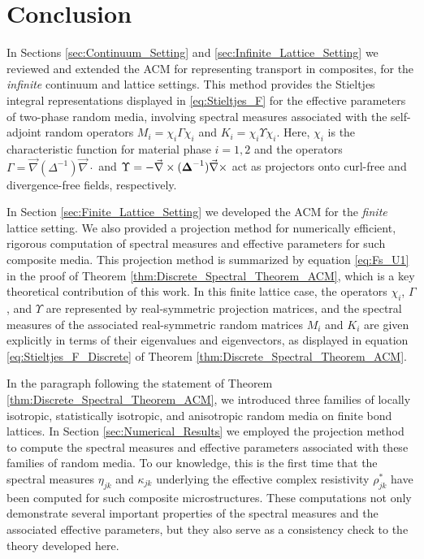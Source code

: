 \documentclass{cmslatex}
\newcommand\bDelta{\mbox{\boldmath${\Delta}$}}
\begin{document}
\section{Conclusion}
%
In Sections \ref{sec:Continuum_Setting} and
\ref{sec:Infinite_Lattice_Setting} we reviewed and extended the ACM for
representing transport in composites, for the \emph{infinite}
continuum and lattice settings. This method provides the Stieltjes
integral representations displayed in \eqref{eq:Stieltjes_F} for the
effective parameters of two-phase random media, involving spectral
measures associated with the self-adjoint random operators
$M_i=\chi_i\Gamma\chi_i$ and $K_i=\chi_i\Upsilon\chi_i$. Here, $\chi_i$ is the characteristic function
for material phase $i=1,2$ and the operators
$\Gamma=\vec{\nabla}(\Delta^{-1})\vec{\nabla}\cdot$ and $\Upsilon=-\vec{\nabla}\times(\bDelta^{-1})\vec{\nabla}\times$
act as projectors onto curl-free and divergence-free fields,
respectively. 






In Section \ref{sec:Finite_Lattice_Setting} we developed the ACM for
the \emph{finite} lattice setting. We also provided a projection
method for numerically efficient, rigorous computation of spectral
measures and effective parameters for such composite media. This
projection method is summarized by equation \eqref{eq:Fs_U1} in the
proof of Theorem
\ref{thm:Discrete_Spectral_Theorem_ACM}, which is a key theoretical
contribution of this work. In this finite lattice case, the operators
$\chi_i$, $\Gamma$, and $\Upsilon$ are represented by real-symmetric projection
matrices, and the spectral measures of the associated real-symmetric
random matrices $M_i$ and $K_i$ are given explicitly in terms of their
eigenvalues and eigenvectors, as displayed in equation
\eqref{eq:Stieltjes_F_Discrete} of Theorem
\ref{thm:Discrete_Spectral_Theorem_ACM}. 



In the paragraph following the statement of Theorem
\ref{thm:Discrete_Spectral_Theorem_ACM}, we introduced three 
families of locally isotropic, statistically isotropic, and
anisotropic random media on finite bond lattices. In Section
\ref{sec:Numerical_Results} we employed the projection method to
compute the spectral measures and effective parameters associated with
these families of random media. To our knowledge, this is the first
time that the spectral measures $\eta_{jk}$ and $\kappa_{jk}$ underlying the
effective complex resistivity $\rho^*_{jk}$ have been computed for such
composite microstructures. These computations not only demonstrate
several important properties of the spectral measures and the
associated effective parameters, but they also serve as a consistency
check to the theory developed here.
\end{document}
